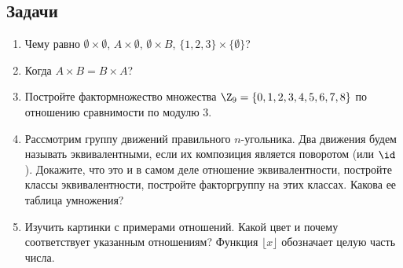 \subsection*{Задачи}


\begin{enumerate}
\item Чему равно $\emptyset\times\emptyset$, $A\times\emptyset$, $\emptyset\times B$, $\{1,2,3\}\times\{\emptyset\}$?
\item Когда $A\times B = B\times A$?
\item Постройте фактормножество множества $\Z_9=\{0,1,2,3,4,5,6,7,8\}$ по отношению сравнимости по модулю $3$.
\item Рассмотрим группу движений правильного $n$-угольника. Два движения будем называть эквивалентными, если их композиция является поворотом (или $\id$). Докажите, что это и в самом деле отношение эквивалентности, постройте классы эквивалентности, постройте факторгруппу на этих классах. Какова ее таблица умножения?
\item Изучить картинки с примерами отношений. Какой цвет и почему соответствует указанным отношениям? Функция $\lfloor x\rfloor$ обозначает целую часть числа.


\end{enumerate}
